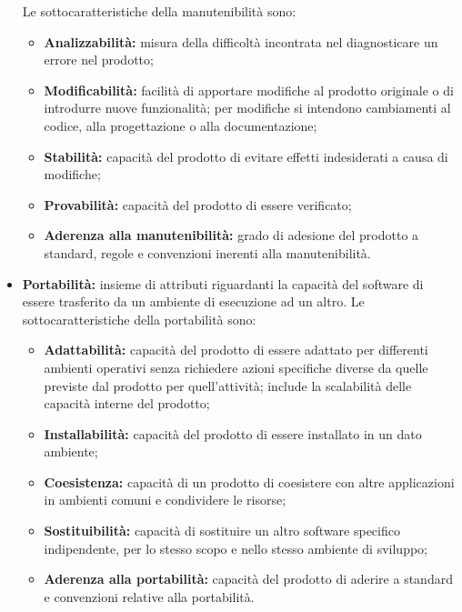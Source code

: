 \begin{itemize}
          Le sottocaratteristiche della manutenibilità sono:
          \begin{itemize}
              \item \textbf{Analizzabilità:} misura della difficoltà incontrata nel diagnosticare un errore nel prodotto;
              \item \textbf{Modificabilità:} facilità di apportare modifiche al prodotto originale o di introdurre nuove funzionalità; per modifiche si intendono cambiamenti al codice, alla progettazione o alla documentazione;
              \item \textbf{Stabilità:} capacità del prodotto di evitare effetti indesiderati a causa di modifiche;
              \item \textbf{Provabilità:} capacità del prodotto di essere verificato;
              \item \textbf{Aderenza alla manutenibilità:} grado di adesione del prodotto a standard, regole e convenzioni inerenti alla manutenibilità.
          \end{itemize}
    \item \textbf{Portabilità:} insieme di attributi riguardanti la capacità del software di essere trasferito da un ambiente di esecuzione ad un altro.
          Le sottocaratteristiche della portabilità sono:
          \begin{itemize}
              \item \textbf{Adattabilità:} capacità del prodotto di essere adattato per differenti ambienti operativi senza richiedere azioni specifiche diverse da quelle previste dal prodotto per quell'attività; include la scalabilità delle capacità interne del prodotto;
              \item \textbf{Installabilità:} capacità del prodotto di essere installato in un dato ambiente;
              \item \textbf{Coesistenza:} capacità di un prodotto di coesistere con altre applicazioni in ambienti comuni e condividere le risorse;
              \item \textbf{Sostituibilità:} capacità di sostituire un altro software specifico indipendente, per lo stesso scopo e nello stesso ambiente di sviluppo;
              \item \textbf{Aderenza alla portabilità:} capacità del prodotto di aderire a standard e convenzioni relative alla portabilità.
          \end{itemize}
\end{itemize}


